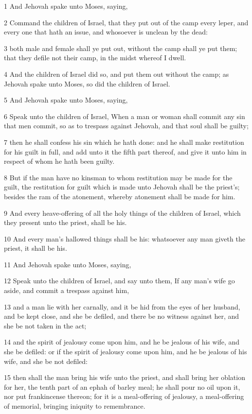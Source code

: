 \par 1 And Jehovah spake unto Moses, saying,
\par 2 Command the children of Israel, that they put out of the camp every leper, and every one that hath an issue, and whosoever is unclean by the dead:
\par 3 both male and female shall ye put out, without the camp shall ye put them; that they defile not their camp, in the midst whereof I dwell.
\par 4 And the children of Israel did so, and put them out without the camp; as Jehovah spake unto Moses, so did the children of Israel.
\par 5 And Jehovah spake unto Moses, saying,
\par 6 Speak unto the children of Israel, When a man or woman shall commit any sin that men commit, so as to trespass against Jehovah, and that soul shall be guilty;
\par 7 then he shall confess his sin which he hath done: and he shall make restitution for his guilt in full, and add unto it the fifth part thereof, and give it unto him in respect of whom he hath been guilty.
\par 8 But if the man have no kinsman to whom restitution may be made for the guilt, the restitution for guilt which is made unto Jehovah shall be the priest's; besides the ram of the atonement, whereby atonement shall be made for him.
\par 9 And every heave-offering of all the holy things of the children of Israel, which they present unto the priest, shall be his.
\par 10 And every man's hallowed things shall be his: whatsoever any man giveth the priest, it shall be his.
\par 11 And Jehovah spake unto Moses, saying,
\par 12 Speak unto the children of Israel, and say unto them, If any man's wife go aside, and commit a trespass against him,
\par 13 and a man lie with her carnally, and it be hid from the eyes of her husband, and be kept close, and she be defiled, and there be no witness against her, and she be not taken in the act;
\par 14 and the spirit of jealousy come upon him, and he be jealous of his wife, and she be defiled: or if the spirit of jealousy come upon him, and he be jealous of his wife, and she be not defiled:
\par 15 then shall the man bring his wife unto the priest, and shall bring her oblation for her, the tenth part of an ephah of barley meal; he shall pour no oil upon it, nor put frankincense thereon; for it is a meal-offering of jealousy, a meal-offering of memorial, bringing iniquity to remembrance.
